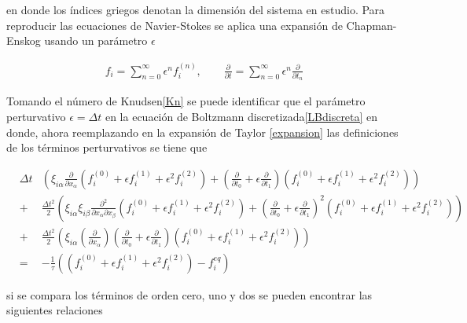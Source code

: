\noindent en donde los índices griegos denotan la dimensión del sistema en estudio. Para reproducir las ecuaciones de Navier-Stokes se aplica una expansión de Chapman-Enskog usando un parámetro $\epsilon$


\begin{eqnarray}
f_{i} = \sum_{n=0}^{\infty} \epsilon^{n} f_{i}^{(n)}, \qquad \frac{\partial}{\partial t} = \sum_{n = 0}^{\infty}\epsilon^{n}\frac{\partial}{\partial t_{n}}
\end{eqnarray}

\noindent Tomando el número de Knudsen\eqref{Kn} se puede identificar que el parámetro perturvativo $\epsilon = \Delta t$ en la ecuación de Boltzmann discretizada\eqref{LBdiscreta} \cite{principal} en donde, ahora reemplazando en la expansión de Taylor \eqref{expansion}  las definiciones de los términos perturvativos se tiene que 

\begin{eqnarray}
&\Delta t&\left(\xi_{i\alpha}\frac{\partial}{\partial x_{\alpha}}\left(f_{i}^{(0)}+\epsilon f_{i}^{(1)} + \epsilon^{2} f_{i}^{(2)}\right) + \left(\frac{\partial}{\partial t_{0}} + \epsilon \frac{\partial}{\partial t_{1}} \right)\left(f_{i}^{(0)}+\epsilon f_{i}^{(1)} + \epsilon^{2} f_{i}^{(2)}\right)\right)\nonumber \\
&+&\frac{\Delta t^{2}}{2}\left(\xi_{i\alpha}\xi_{i\beta}\frac{\partial^{2}}{\partial x_{\alpha}\partial x_{\beta}}\left(f_{i}^{(0)}+\epsilon f_{i}^{(1)} + \epsilon^{2} f_{i}^{(2)}\right)+\left(\frac{\partial}{\partial t_{0}} + \epsilon \frac{\partial}{\partial t_{1}} \right)^{2}\left(f_{i}^{(0)}+\epsilon f_{i}^{(1)} + \epsilon^{2} f_{i}^{(2)}\right)\right)\nonumber \\
&+&\frac{\Delta t^{2}}{2}\left(\xi_{i\alpha}\left(\frac{\partial}{\partial x_{\alpha}}\right)\left(\frac{\partial}{\partial t_{0}} + \epsilon \frac{\partial}{\partial t_{1}} \right)\left(f_{i}^{(0)}+\epsilon f_{i}^{(1)} + \epsilon^{2} f_{i}^{(2)}\right)\right) \nonumber\\
&=& -\frac{1}{\tau}\left(\left(f_{i}^{(0)}+\epsilon f_{i}^{(1)} + \epsilon^{2} f_{i}^{(2)}\right)-f_{i}^{eq}\right)
\end{eqnarray}

\noindent si se compara los términos de orden cero, uno y dos se pueden encontrar las siguientes relaciones 

